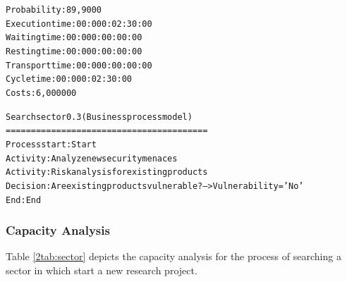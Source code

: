 \begin{alltt}
Probability:   89,9000%
Execution time:  00:000:02:30:00
Waiting time:  00:000:00:00:00
Resting time:  00:000:00:00:00
Transport time:  00:000:00:00:00
Cycle time:  00:000:02:30:00
Costs:  6,000000

Search sector 0.3 (Business process model)
========================================
Process start: Start
Activity: Analyze new security menaces
Activity: Risk analysis for existing products
Decision: Are existing products vulnerable? --> Vulnerability = 'No'
End: End
\end{alltt}

\subsubsection{Capacity Analysis}
Table \ref{2tab:sector} depicts the capacity analysis for the process of
searching a sector in which start a new research project.

